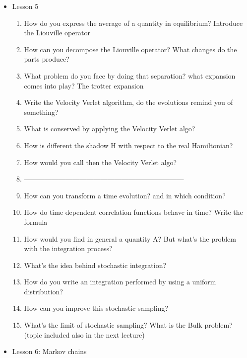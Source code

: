 {\begin{itemize}
\begin{enumerate}
        \item What is the mathematical difference between the two previous integrators?
        \item What is the meaning of symplectic?
        \item What is a unitary matrix what is the case for the Euler-Cromer integrator?
    \end{enumerate}
    \item Lesson 5
    \begin{enumerate}
        \item How do you express the average of a quantity in equilibrium? Introduce the Liouville operator
        \item How can you decompose the Liouville operator? What changes do the parts produce?
        \item What problem do you face by doing that separation? what expansion comes into play? The trotter expansion
        \item Write the Velocity Verlet algorithm, do the evolutions remind you of something?
        \item What is conserved by applying the Velocity Verlet algo?
        \item How is different the shadow H with respect to the real Hamiltonian?
        \item How would you call then the Velocity Verlet algo?
        \item ---------------------------------------------------------------------
        \item How can you transform a time evolution? and in which condition?
        \item How do time dependent correlation functions behave in time? Write the formula
        \item How would you find in general a quantity A? But what's the problem with the integration process?
        \item What's the idea behind stochastic integration?
        \item How do you write an integration performed by using a uniform distribution?
        \item How can you improve this stochastic sampling?
        \item What's the limit of stochastic sampling? What is the Bulk problem? (topic included also in the next lecture)
    \end{enumerate}
    \item Lesson 6: Markov chains
    \begin{enumerate}

\end{enumerate}
\end{itemize}}
